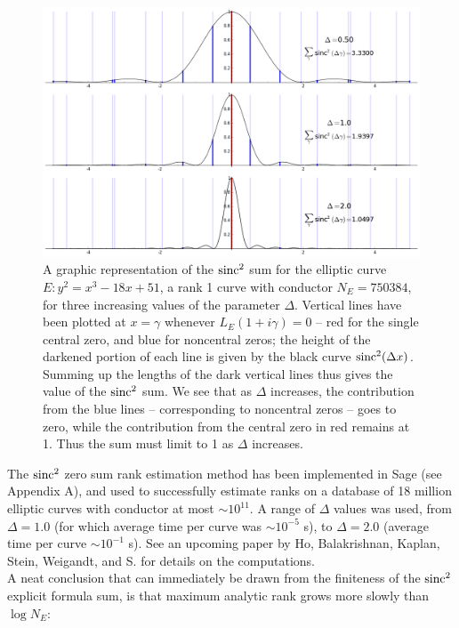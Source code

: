 \begin{figure}[!h]
    \centering
    \includegraphics[width=1.0\textwidth]{graphics/zero_sum_visualization.png}
    \caption{A graphic representation of the $\operatorname{sinc}^2$ sum for the elliptic curve $E: y^2=x^3-18x+51$, a rank 1 curve with conductor $N_E=750384$, for three increasing values of the parameter $\Delta$. Vertical lines have been plotted at $x=\gamma$ whenever $L_E(1+i\gamma)=0$ -- red for the single central zero, and blue for noncentral zeros; the height of the darkened portion of each line is given by the black curve $\operatorname{sinc}^2(\Delta x)$. Summing up the lengths of the dark vertical lines thus gives the value of the $\operatorname{sinc}^2$ sum. We see that as $\Delta$ increases, the contribution from the blue lines -- corresponding to noncentral zeros -- goes to zero, while the contribution from the central zero in red remains at 1. Thus the sum must limit to 1 as $\Delta$ increases.}
    \label{fig:zero_sum_visualization}
\end{figure}

The $\operatorname{sinc}^2$ zero sum rank estimation method has been implemented in Sage (see Appendix A), and used to successfully estimate ranks on a database of 18 million elliptic curves with conductor at most $\sim 10^{11}$. A range of $\Delta$ values was used, from $\Delta=1.0$ (for which average time per curve was $\sim 10^{-5}$ s), to $\Delta=2.0$ (average time per curve $\sim 10^{-1}$ s). See an upcoming paper by Ho, Balakrishnan, Kaplan, Stein, Weigandt, and S. for details on the computations. \\

A neat conclusion that can immediately be drawn from the finiteness of the $\operatorname{sinc}^2$ explicit formula sum, is that maximum analytic rank grows more slowly than $\log N_E$:

